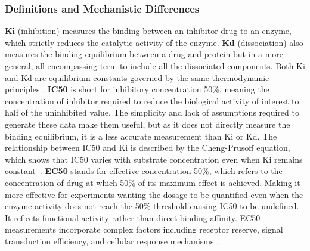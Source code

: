 \subsubsection{Definitions and Mechanistic Differences}
\textbf{Ki} (inhibition) measures the binding between an inhibitor drug to an enzyme, which strictly reduces the catalytic activity of the enzyme.
\textbf{Kd} (dissociation) also measures the binding equilibrium between a drug and protein but in a more general, all-encompassing term to include all the dissociated components.
Both Ki and Kd are equilibrium constants governed by the same thermodynamic principles \citep{sciencesnail_ki_kd}.
\textbf{IC50} is short for inhibitory concentration 50\%, meaning the concentration of inhibitor required to reduce the biological activity of interest to half of the uninhibited value.
The simplicity and lack of assumptions required to generate these data make them useful, but as it does not directly measure the binding equilibrium, it is a less accurate measurement than Ki or Kd. The relationship between IC50 and Ki is described by the Cheng-Prusoff equation, which shows that IC50 varies with substrate concentration even when Ki remains constant~\citep{cheng_prusoff}.
\textbf{EC50} stands for effective concentration 50\%, which refers to the concentration of drug at which 50\% of its maximum effect is achieved.
Making it more effective for experiments wanting the dosage to be quantified even when the enzyme activity does not reach the 50\% threshold causing IC50 to be undefined.
It reflects functional activity rather than direct binding affinity.
EC50 measurements incorporate complex factors including receptor reserve, signal transduction efficiency, and cellular response mechanisms \citep{sciencesnail_ki_kd}.
